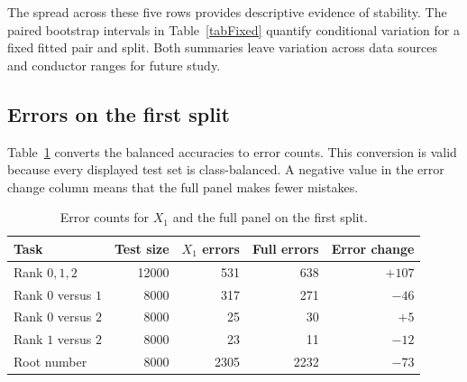 \documentclass[12pt,reqno]{amsart}
\numberwithin{equation}{section}
\theoremstyle{plain}
\theoremstyle{definition}
\theoremstyle{remark}
\begin{document}
\begin{table}[H]
\centering
\caption{The five complete assignment results from the archived main run.}
\label{tabSplitRows}
\end{table}

The spread across these five rows provides descriptive evidence of stability.
The paired bootstrap intervals in Table~\ref{tabFixed} quantify conditional variation for a fixed fitted pair and split.
Both summaries leave variation across data sources and conductor ranges for future study.

\subsection{Errors on the first split}

Table~\ref{tabErrorCounts} converts the balanced accuracies to error counts.
This conversion is valid because every displayed test set is class-balanced.
A negative value in the error change column means that the full panel makes fewer mistakes.

\begin{table}[H]
\centering
\caption{Error counts for $X_1$ and the full panel on the first
split.}
\label{tabErrorCounts}
\begin{tabular}{lrrrr}
\toprule
Task & Test size & $X_1$ errors & Full errors & Error change\\
\midrule
Rank $0,1,2$ & 12000 & 531 & 638 & $+107$\\
Rank $0$ versus $1$ & 8000 & 317 & 271 & $-46$\\
Rank $0$ versus $2$ & 8000 & 25 & 30 & $+5$\\
Rank $1$ versus $2$ & 8000 & 23 & 11 & $-12$\\
Root number & 8000 & 2305 & 2232 & $-73$\\
\bottomrule
\end{tabular}
\end{table}
\end{document}
